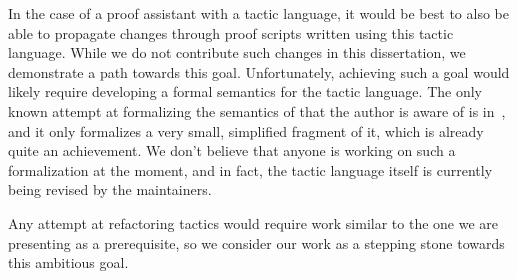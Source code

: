 In the case of a proof assistant with a tactic language, it would be best to
also be able to propagate changes through proof scripts written using this
tactic language.  While we do not contribute such changes in this dissertation,
we demonstrate a path towards this goal.  Unfortunately, achieving such a goal
would likely require developing a formal semantics for the tactic language.  The
only known attempt at formalizing the semantics of \Ltac{} that the author is
aware of is in~, and it only formalizes a very small,
simplified fragment of it, which is already quite an achievement.  We don't
believe that anyone is working on such a formalization at the moment, and in
fact, the tactic language itself is currently being revised by the \Coq{}
maintainers.

Any attempt at refactoring tactics would require work similar to the one we are
presenting as a prerequisite, so we consider our work as a stepping
stone towards this ambitious goal.
